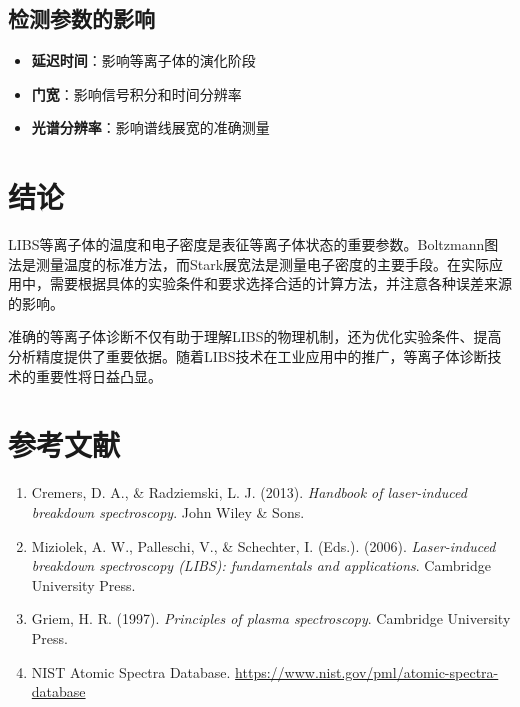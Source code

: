 \documentclass[12pt,a4paper]{article}
\begin{document}
\subsection{检测参数的影响}

\begin{itemize}
    \item \textbf{延迟时间}：影响等离子体的演化阶段
    \item \textbf{门宽}：影响信号积分和时间分辨率
    \item \textbf{光谱分辨率}：影响谱线展宽的准确测量
\end{itemize}

\section{结论}

LIBS等离子体的温度和电子密度是表征等离子体状态的重要参数。Boltzmann图法是测量温度的标准方法，而Stark展宽法是测量电子密度的主要手段。在实际应用中，需要根据具体的实验条件和要求选择合适的计算方法，并注意各种误差来源的影响。

准确的等离子体诊断不仅有助于理解LIBS的物理机制，还为优化实验条件、提高分析精度提供了重要依据。随着LIBS技术在工业应用中的推广，等离子体诊断技术的重要性将日益凸显。

\section*{参考文献}

\begin{enumerate}
    \item Cremers, D. A., \& Radziemski, L. J. (2013). \textit{Handbook of laser-induced breakdown spectroscopy}. John Wiley \& Sons.
    \item Miziolek, A. W., Palleschi, V., \& Schechter, I. (Eds.). (2006). \textit{Laser-induced breakdown spectroscopy (LIBS): fundamentals and applications}. Cambridge University Press.
    \item Griem, H. R. (1997). \textit{Principles of plasma spectroscopy}. Cambridge University Press.
    \item NIST Atomic Spectra Database. \url{https://www.nist.gov/pml/atomic-spectra-database}
\end{enumerate}
\end{document}
